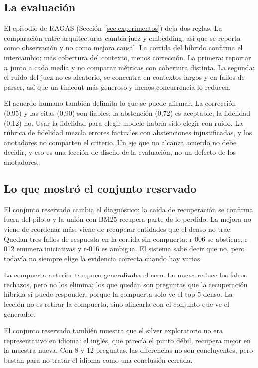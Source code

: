 \subsection{La evaluaci\'on}

El episodio de RAGAS (Secci\'on~\ref{sec:experimentos}) deja dos reglas. La comparaci\'on entre arquitecturas cambia juez y embedding, as\'i que se reporta como observaci\'on y no como mejora causal. La corrida del h\'ibrido confirma el intercambio: m\'as cobertura del contexto, menos correcci\'on. La primera: reportar $n$ junto a cada media y no comparar m\'etricas con cobertura distinta. La segunda: el ruido del juez no es aleatorio, se concentra en contextos largos y en fallos de parser, as\'i que un timeout m\'as generoso y menos concurrencia lo reducen.

El acuerdo humano tambi\'en delimita lo que se puede afirmar. La correcci\'on (0,95) y las citas (0,90) son fiables; la abstenci\'on (0,72) es aceptable; la fidelidad (0,12) no. Usar la fidelidad para elegir modelo habr\'ia sido elegir con ruido. La r\'ubrica de fidelidad mezcla errores factuales con abstenciones injustificadas, y los anotadores no comparten el criterio. Un eje que no alcanza acuerdo no debe decidir, y eso es una lecci\'on de dise\~no de la evaluaci\'on, no un defecto de los anotadores.

\subsection{Lo que mostr\'o el conjunto reservado}

El conjunto reservado cambia el diagn\'ostico: la ca\'ida de recuperaci\'on se confirma fuera del piloto y la uni\'on con BM25 recupera parte de lo perdido. La mejora no viene de reordenar m\'as: viene de recuperar entidades que el denso no trae. Quedan tres fallos de respuesta en la corrida sin compuerta: r-006 se abstiene, r-012 enumera iniciativas y r-016 es ambigua. El sistema sabe decir que no, pero todav\'ia no siempre elige la evidencia correcta cuando hay varias.

La compuerta anterior tampoco generalizaba el cero. La nueva reduce los falsos rechazos, pero no los elimina; los que quedan son preguntas que la recuperaci\'on h\'ibrida s\'i puede responder, porque la compuerta solo ve el top-5 denso. La lecci\'on no es retirar la compuerta, sino alinearla con el conjunto que ve el generador.

El conjunto reservado tambi\'en muestra que el silver exploratorio no era representativo en idioma: el ingl\'es, que parec\'ia el punto d\'ebil, recupera mejor en la muestra nueva. Con 8 y 12 preguntas, las diferencias no son concluyentes, pero bastan para no tratar el idioma como una conclusi\'on cerrada.

